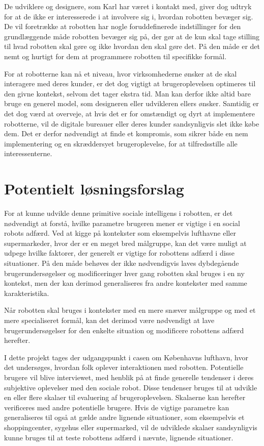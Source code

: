 De udviklere og designere, som Karl har været i kontakt med, giver dog udtryk for at de ikke er interesserede i at involvere sig i, hvordan robotten bevæger sig. De vil foretrække at robotten har nogle foruddefinerede indstillinger for den grundlæggende måde robotten bevæger sig på, der gør at de kun skal tage stilling til hvad robotten skal gøre og ikke hvordan den skal gøre det. På den måde er det nemt og hurtigt for dem at programmere robotten til specifikke formål.

For at robotterne kan nå et niveau, hvor virksomhederne ønsker at de skal interagere med deres kunder, er det dog vigtigt at brugeroplevelsen optimeres til den givne kontekst, selvom det tager ekstra tid. Man kan derfor ikke altid bare bruge en generel model, som designeren eller udvikleren ellers ønsker. Samtidig er det dog værd at overveje, at hvis det er for omstændigt og dyrt at implementere robotterne, vil de digitale bureauer eller deres kunder sandsynligvis slet ikke købe dem. Det er derfor nødvendigt at finde et kompromis, som sikrer både en nem implementering og en skræddersyet brugeroplevelse, for at tilfredsstille alle interessenterne. 

\section{Potentielt løsningsforslag}
\label{PotentieltLoesningsforslag}
%
For at kunne udvikle denne primitive sociale intelligens i robotten, er det nødvendigt at forstå, hvilke parametre brugeren mener er vigtige i en social robots adfærd. Ved at kigge på kontekster som eksempelvis lufthavne eller supermarkeder, hvor der er en meget bred målgruppe, kan det være muligt at udpege hvilke faktorer, der generelt er vigtige for robottens adfærd i disse situationer. På den måde behøves der ikke nødvendigvis laves dybdegående brugerundersøgelser og modificeringer hver gang robotten skal bruges i en ny kontekst, men der kan derimod generaliseres fra andre kontekster med samme karakteristika.

Når robotten skal bruges i kontekster med en mere snæver målgruppe og med et mere specialiseret formål, kan det derimod være nødvendigt at lave brugerundersøgelser for den enkelte situation og modificere robottens adfærd herefter. 

I dette projekt tages der udgangspunkt i casen om Københavns lufthavn, hvor det undersøges, hvordan folk oplever interaktionen med robotten. Potentielle brugere vil blive interviewet, med henblik på at finde generelle tendenser i deres subjektive oplevelser med den sociale robot. Disse tendenser bruges til at udvikle en eller flere skalaer til evaluering af brugeroplevelsen. Skalaerne kan herefter verificeres med andre potentielle brugere. Hvis de vigtige parametre kan generaliseres til også at gælde andre lignende situationer, som eksempelvis et shoppingcenter, sygehus eller supermarked, vil de udviklede skalaer sandsynligvis kunne bruges til at teste robottens adfærd i nævnte, lignende situationer.

